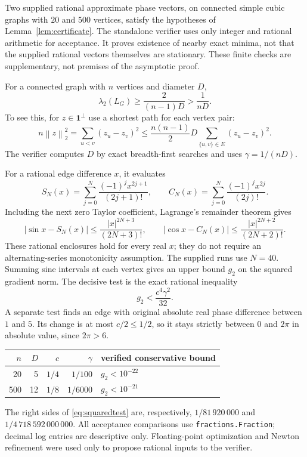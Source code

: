 \documentclass[11pt]{article}
\theoremstyle{definition}
\theoremstyle{remark}
\newcommand{\one}{\mathbf 1}
\newcommand{\norm}[1]{\left\lVert#1\right\rVert}
\begin{document}
Two supplied rational approximate phase vectors, on connected simple cubic
graphs with $20$ and $500$ vertices, satisfy the hypotheses of
Lemma~\ref{lem:certificate}. The standalone verifier uses only integer and
rational arithmetic for acceptance. It proves existence of nearby exact
minima, not that the supplied rational vectors themselves are stationary.
These finite checks are supplementary, not premises of the asymptotic proof.

For a connected graph with $n$ vertices and diameter $D$,
\begin{equation}\label{eq:diamgap}
 \lambda_2(L_G)\ge\frac{2}{(n-1)D}>\frac1{nD}.
\end{equation}
To see this, for $z\in\one^\perp$ use a shortest path for each vertex pair:
\[
 n\norm z_2^2=\sum_{u<v}(z_u-z_v)^2
 \le\frac{n(n-1)}2 D\sum_{\{u,v\}\in E}(z_u-z_v)^2.
\]
The verifier computes $D$ by exact breadth-first searches and uses
$\gamma=1/(nD)$.

For a rational edge difference $x$, it evaluates
\[
 S_N(x)=\sum_{j=0}^N\frac{(-1)^jx^{2j+1}}{(2j+1)!},\qquad
 C_N(x)=\sum_{j=0}^N\frac{(-1)^jx^{2j}}{(2j)!}.
\]
Including the next zero Taylor coefficient, Lagrange's remainder theorem
gives
\[
 |\sin x-S_N(x)|\le\frac{|x|^{2N+3}}{(2N+3)!},\qquad
 |\cos x-C_N(x)|\le\frac{|x|^{2N+2}}{(2N+2)!}.
\]
These rational enclosures hold for every real $x$; they do not require an
alternating-series monotonicity assumption. The supplied runs use $N=40$.
Summing sine intervals at each vertex gives an upper bound $g_2$ on the
squared gradient norm. The decisive test is the exact rational inequality
\begin{equation}\label{eq:squaredtest}
 g_2<\frac{c^4\gamma^2}{32}.
\end{equation}
A separate test finds an edge with original absolute real phase difference
between $1$ and $5$. Its change is at most $c/2\le1/2$, so it stays strictly
between $0$ and $2\pi$ in absolute value, since $2\pi>6$.

\begin{center}
\small
\begin{tabular}{@{}rrrrl@{}}
\toprule
$n$ & $D$ & $c$ & $\gamma$ & verified conservative bound\\
\midrule
20 & 5 & $1/4$ & $1/100$ & $g_2<10^{-22}$\\
500 & 12 & $1/8$ & $1/6000$ & $g_2<10^{-21}$\\
\bottomrule
\end{tabular}
\end{center}
The right sides of \eqref{eq:squaredtest} are, respectively,
$1/81\,920\,000$ and $1/4\,718\,592\,000\,000$.
All acceptance comparisons use \texttt{fractions.Fraction}; decimal log
entries are descriptive only. Floating-point optimization and Newton
refinement were used only to propose rational inputs to the verifier.
\end{document}
